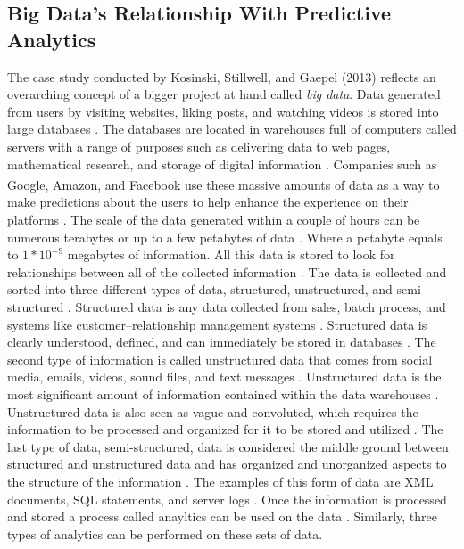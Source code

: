 \documentclass[a4paper, 12pt]{article}
\begin{document}
\subsection{Big Data's Relationship With Predictive Analytics}
\begin{paragraph}
\indent The case study conducted by Kosinski, Stillwell, and Gaepel (2013) reflects an overarching concept of a bigger project at hand called \textit{big data}. Data generated from users by visiting websites, liking posts, and watching videos is stored into large databases \cite{Jeble2016}. The databases are located in warehouses full of computers called servers with a range of purposes such as delivering data to web pages, mathematical research, and storage of digital information \cite{Jeble2016}. Companies such as Google\textsuperscript{\textregistered}, Amazon\textsuperscript{\textregistered}, and Facebook\textsuperscript{\textregistered}
use these massive amounts of data as a way to make predictions about the users to help enhance the experience on their platforms \cite{Jeble2016}. The scale of the data generated within a couple of hours can be numerous terabytes or up to a few petabytes of data \cite{Jeble2016}. Where a petabyte equals to $1*10^{-9}$ megabytes of information. All this data is stored to look for relationships between all of the collected information \cite{Jeble2016}. The data is collected and sorted into three different types of data, structured, unstructured, and semi-structured \cite{Jeble2016}. Structured data is any data collected from sales, batch process, and systems like customer--relationship management systems \cite{Jeble2016}. Structured data is clearly understood, defined, and can immediately be stored in databases  \cite{Jeble2016}. The second type of information is called unstructured data that comes from social media, emails, videos, sound files, and text messages \cite{Jeble2016}. Unstructured data is the most significant amount of information contained within the data warehouses \cite{Jeble2016}. Unstructured data is also seen as vague and convoluted, which requires the information to be processed and organized for it to be stored and utilized \cite{Jeble2016}. The last type of data, semi-structured, data is considered the middle ground between structured and unstructured data and has organized  and unorganized aspects to the structure of the information \cite{Jeble2016}. The examples of this form of data are XML documents, SQL statements, and server logs \cite{Jeble2016}. Once the information is processed and stored a process called anayltics can be used on the data \cite{Jeble2016}. Similarly, three types of analytics can be performed on these sets of data.
\end{paragraph}
\end{document}
